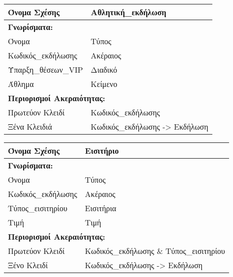 \begin{tabular}{|p{6cm}|p{8cm}|}
  \hline
  Όνομα Σχέσης      & Αθλητική\_εκδήλωση                    \\ \hline
  \multicolumn{2}{|l|}{\textbf{Γνωρίσματα:}}               \\ \hline
  Όνομα             & Τύπος                                \\ \hline
  Κωδικός\_εκδήλωσης & Ακέραιος                             \\ \hline
  Ύπαρξη\_θέσεων\_VIP & Διαδικό                              \\ \hline
  Άθλημα            & Κείμενο                              \\ \hline
  \multicolumn{2}{|l|}{\textbf{Περιορισμοί Ακεραιότητας:}} \\ \hline
  Πρωτεύον Κλειδί   & Κωδικός\_εκδήλωσης                    \\ \hline
  Ξένα Κλειδιά      & Κωδικός\_εκδήλωσης -> Εκδήλωση        \\ \hline
\end{tabular}

\begin{tabular}{|p{6cm}|p{8cm}|}
  \hline
  Όνομα Σχέσης      & Εισιτήριο                             \\ \hline
  \multicolumn{2}{|l|}{\textbf{Γνωρίσματα:}}                \\ \hline
  Όνομα             & Τύπος                                 \\ \hline
  Κωδικός\_εκδήλωσης & Ακέραιος                              \\ \hline
  Τύπος\_εισιτηρίου  & Εισιτήρια                             \\ \hline
  Τιμή              & Τιμή                                  \\ \hline
  \multicolumn{2}{|l|}{\textbf{Περιορισμοί Ακεραιότητας:}}  \\ \hline
  Πρωτεύον Κλειδί   & Κωδικός\_εκδήλωσης \& Τύπος\_εισιτηρίου \\ \hline
  Ξένο Κλειδί       & Κωδικός\_εκδήλωσης -> Εκδήλωση         \\ \hline
\end{tabular}



